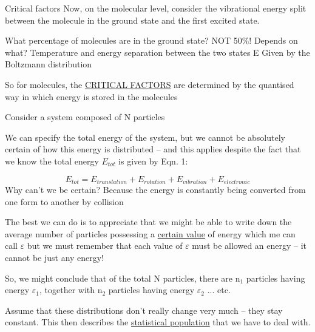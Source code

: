 \documentclass[ignorenonframetext]{beamer}
\begin{document}
\begin{frame}{Critical factors}
Now, on the molecular level, consider the vibrational energy split between the molecule in the ground state and the first excited state.


What percentage of molecules are in the ground state? NOT 50\%!\newline
Depends on what? Temperature and energy separation between the two states E\newline
Given by the Boltzmann distribution\newline

So for molecules, the \underline{CRITICAL FACTORS} are determined by the quantised way in which energy is stored in the molecules
\end{frame}

\begin{frame}[allowframebreaks=0.6]
Consider a system composed of N particles\par
We can specify the total energy of the system, but we cannot be absolutely certain of how this energy is distributed -- and this applies despite the fact that we know the total energy \(E_{tot}\) is given by Eqn. 1:\par
\[E_{tot} = E_{translation} + E_{rotation} + E_{vibration} + E_{electronic}\]
Why can't we be certain? Because the energy is constantly being converted from one form to another by collision\par
The best we can do is to appreciate that we might be able to write down the average number of particles possessing a \underline{certain value} of energy which me can call \(\varepsilon\) but we must remember that each value of \(\varepsilon\) must be allowed an energy -- it cannot be just any energy!\par
So, we might conclude that of the total N particles, there are n\(_1\) particles having energy \(\varepsilon_1\), together with n\(_2\) particles having energy \(\varepsilon_2\) ... etc.\par
Assume that these distributions don't really change very much -- they stay constant. This then describes the \underline{statistical population} that we have to deal with.
\end{frame}
\end{document}
